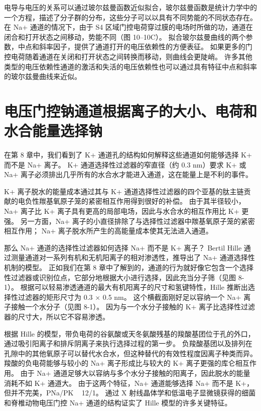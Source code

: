 电导与电压的关系可以通过玻尔兹曼函数近似拟合，玻尔兹曼函数是统计力学中的一个方程，描述了分子群的分布，这些分子可以以具有不同势能的不同状态存在。 在 Na+ 通道的情况下，由于 S4 区域门控电荷穿过膜的电场时所做的功，通道在闭合和打开状态之间移动，势能不同（图 10–10C）。 拟合玻尔兹曼曲线的两个参数，中点和斜率因子，提供了通道打开的电压依赖性的方便表征。 如果更多的门控电荷随着通道在关闭和打开状态之间转换而移动，则曲线会更陡峭。 许多其他类型的电压依赖性通道的激活和失活的电压依赖性也可以通过具有特征中点和斜率的玻尔兹曼曲线来近似。

\section{电压门控钠通道根据离子的大小、电荷和水合能量选择钠}

在第 8 章中，我们看到了 K+ 通道孔的结构如何解释这些通道如何能够选择 K+ 而不是 Na+ 离子。 K+ 通道选择性过滤器的窄直径（约 0.3 nm）要求 K+ 或 Na+ 离子必须排出几乎所有的水合水才能进入通道，这在能量上是不利的事件。

K+ 离子脱水的能量成本通过其与 K+ 通道选择性过滤器的四个亚基的肽主链贡献的电负性羰基氧原子笼的紧密相互作用得到很好的补偿。 由于其半径较小，Na+ 离子比 K+ 离子具有更高的局部电场，因此与水合水的相互作用比 K+ 更强。 另一方面，Na+ 离子的小直径排除了与选择性过滤器中羰基氧原子笼的紧密相互作用； Na+ 离子脱水所产生的高能量成本使其无法进入通道。

那么 Na+ 通道的选择性过滤器如何选择 Na+ 而不是 K+ 离子？ Bertil Hille 通过测量通道对一系列有机和无机阳离子的相对渗透性，推导出了 Na+ 通道选择性机制的模型。 正如我们在第 8 章中了解到的，通道的行为就好像它包含一个选择性过滤器或识别位点，它部分地根据大小进行选择，因此充当分子筛（见图 8-1）。 根据可以轻易渗透通道的最大有机阳离子的尺寸和氢键特性，Hille 推断出选择性过滤器的矩形尺寸为 0.3 × 0.5 nm。 这个横截面刚好足以容纳一个 Na+ 离子接触一个水分子（见图 8-1）。 因为与一个水分子接触的 K+ 离子比选择性过滤器的尺寸大，所以它不容易渗透。

根据 Hille 的模型，带负电荷的谷氨酸或天冬氨酸残基的羧酸基团位于孔的外口，通过吸引阳离子和排斥阴离子来执行选择过程的第一步。 负羧酸基团以及排列在孔隙中的其他氧原子可以替代水合水，但这种替代的有效性程度因离子种类而异。 羧酸的负电荷能够与较小的 Na+ 离子形成比与较大的 K+ 离子更强的库仑相互作用。 由于 Na+ 通道足够大以容纳与多个水分子接触的阳离子，因此脱水的能量消耗不如 K+ 通道大。 由于这两个特征，Na+ 通道能够选择 Na+ 而不是 K+，但并不完美，PNa/PK ~ 12/1。 通过 X 射线晶体学和低温电子显微镜获得的细菌和脊椎动物电压门控 Na+ 通道的结构证实了 Hille 模型的许多关键特征。

